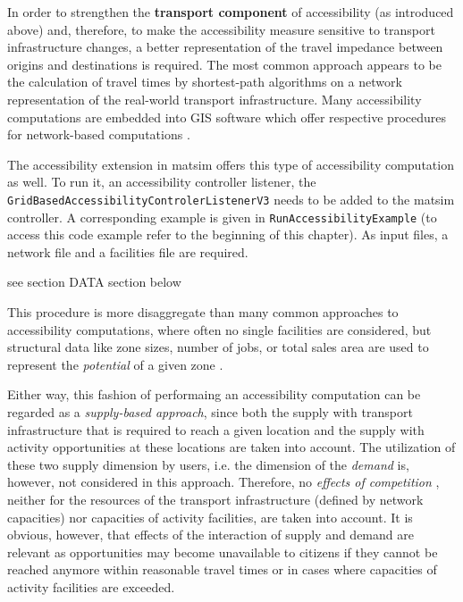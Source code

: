 In order to strengthen the \textbf{transport component} of accessibility (as introduced above) and, therefore, to make 
the accessibility measure sensitive to transport infrastructure changes, a better representation of the travel 
impedance between origins and destinations is required. The most common approach appears to be the calculation of travel 
times by shortest-path algorithms on a network representation of the real-world transport infrastructure.
Many accessibility computations are embedded into GIS software which offer respective procedures for network-based 
computations \citep{BBSR20xxErreichbarkeitsmodell, CurtisEtAl2013AccessibilityPolicyInnovation, BuettnerEtAl2010Erreichbarkeitsatlas}.

%

The accessibility extension in \gls{matsim} offers this type of accessibility computation as well. To run it, an 
accessibility controller listener, \eg the \texttt{GridBasedAccessibilityControlerListenerV3} needs to be added to 
the \gls{matsim} controller. A corresponding example is given in \texttt{RunAccessibilityExample} (to access this 
code example refer to the beginning of this chapter). As input files, a network file and a facilities file are required.

see section DATA section below

This procedure is more disaggregate than many common approaches to accessibility computations, where often no single facilities
are considered, but structural data like zone sizes, number of jobs, or total sales area are used to represent the 
\textit{potential} of a given zone \citep{BuettnerEtAl2010Erreichbarkeitsatlas, GulhanEtAl2014PotentialAccessibilityMeasureDenizli}.


Either way, this fashion of performaing an accessibility computation can be regarded as a \textit{supply-based approach}, since 
both the supply with transport infrastructure that is required to reach a given location and the supply with activity opportunities at
these locations are taken into account. The utilization of these two supply dimension by users, i.e. the dimension of 
the \textit{demand} is, however, not considered in this approach. Therefore, no \textit{effects of competition} \citep{Geurs2004AccessibilityReview}, neither for the resources of the transport infrastructure (defined by network 
capacities) nor capacities of activity facilities, are taken into account. It is obvious, however, that effects of the 
interaction of supply and demand are relevant as opportunities may become unavailable to citizens if they cannot be reached 
anymore within reasonable travel times or in cases where capacities of activity facilities are exceeded. 

